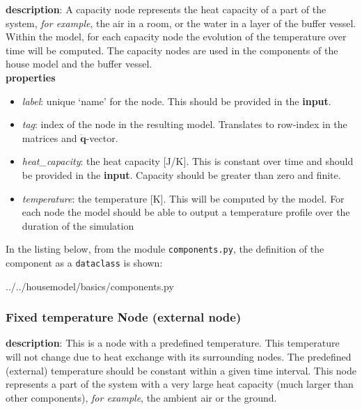 \textbf{description}: A capacity node represents the heat capacity of a part of the system, \textit{for example}, the air in a room, or the water in a layer of the buffer vessel. Within the model, for each capacity node the evolution of the temperature over time will be computed. The capacity nodes are used in the components of the house model and the buffer vessel. 
\\
\textbf{properties}

\begin{itemize}
	\item \emph{label}: unique `name' for the node. This should be provided in the \textbf{input}.
	\item \emph{tag}: index of the node in the resulting model. Translates to row-index in the matrices and $\mathbf{\dot{q}}$-vector.
	\item \emph{heat\_capacity}: the heat capacity [J/K]. This is constant over time and should be provided in the \textbf{input}. Capacity should be greater than zero and finite.  
	\item \emph{temperature}: the temperature [K]. This will be computed by the model. For each node the model should be able to output a temperature profile over the duration of the simulation
\end{itemize}

In the listing below, from the module \texttt{components.py}, the definition of the component as a \texttt{dataclass} is shown: 
\begin{minipage}{\linewidth}

{../../housemodel/basics/components.py}
\end{minipage}

\subsubsection{Fixed temperature Node (external node)} \label{sec:fixnode}
\textbf{description}: This is a node with a predefined temperature. This temperature will not change due to heat exchange with its surrounding nodes. The predefined (external) temperature should be constant within a given time interval. This node represents a part of the system with a very large heat capacity (much larger than other components), \textit{for example}, the ambient air or the ground. 

